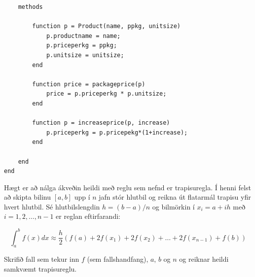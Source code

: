 \documentclass[addpoints]{exam}
\begin{document}
\begin{questions}
\begin{solution}
\begin{verbatim}
    methods
        
        function p = Product(name, ppkg, unitsize)
            p.productname = name;
            p.priceperkg = ppkg;
            p.unitsize = unitsize;
        end
        
        function price = packageprice(p)
            price = p.priceperkg * p.unitsize;
        end
        
        function p = increaseprice(p, increase)
            p.priceperkg = p.pricepekg*(1+increase);
        end
        
    end
end
\end{verbatim}
   
\end{solution}

\newpage

\question[10] Hægt er að nálga ákveðin heildi með reglu sem nefnd er trapisuregla. Í henni felst að skipta bilinu $[a,b]$ upp í $n$ jafn stór hlutbil og reikna út flatarmál trapisu yfir hvert hlutbil. Sé hlutbilslengdin $h = (b-a)/n$ og bilmörkin í $x_i=a+ih$ með $i = 1,2,\ldots,n-1$ er reglan eftirfarandi:

\[
    \int_a^b f(x) dx \approx \frac{h}{2}\left(f(a) + 2f(x_1) + 2f(x_2) + \ldots + 2f(x_{n-1}) + f(b)\right)
\]

Skrifið fall sem tekur inn $f$ (sem fallshandfang), $a$, $b$ og $n$ og reiknar heildi samkvæmt trapisureglu.

\end{questions}
\end{document}

